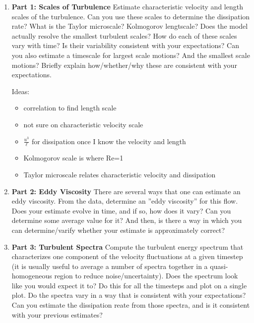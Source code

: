\documentclass[11pt]{article}
\begin{document}
\begin{enumerate}

    \item \textbf{Part 1: Scales of Turbulence} Estimate characteristic velocity and length scales of the turbulence. Can you use these scales to determine the dissipation rate? What is the Taylor microscale? Kolmogorov lengtscale? Does the model actually resolve the smallest turbulent scales? How do each of these scales vary with time? Is their variability consistent with your expectations? Can you also estimate a timescale for largest scale motions? And the smallest scale motions? Briefly explain how/whether/why these are consistent with your expectations.\par
    
    Ideas:
    \begin{itemize}
        \item correlation to find length scale
        \item not sure on characteristic velocity scale
        \item $\frac{u^3}{\ell}$ for dissipation once I know the velocity and length
        \item Kolmogorov scale is where Re=1
        \item Taylor microscale relates characteristic velocity and dissipation
    \end{itemize}
    

    \item \textbf{Part 2: Eddy Viscosity} There are several ways that one can estimate an eddy viscosity. From the data, determine an ''eddy viscosity'' for this flow. Does your estimate evolve in time, and if so, how does it vary? Can you determine some average value for it? And then, is there a way in which you can determine/varify whether your estimate is approximately correct?
    

    \item \textbf{Part 3: Turbulent Spectra} Compute the turbulent energy spectrum that characterizes one component of the velocity fluctuations at a given timestep (it is usually useful to average a number of spectra together in a quasi-homogeneous region to reduce noise/uncertainty). Does the spectrum look like you would expect it to? Do this for all the timesteps and plot on a single plot. Do the spectra vary in a way that is consistent with your expectations? Can you estimate the dissipation reate from those spectra, and is it consistent with your previous estimates?



\end{enumerate}
\end{document}
